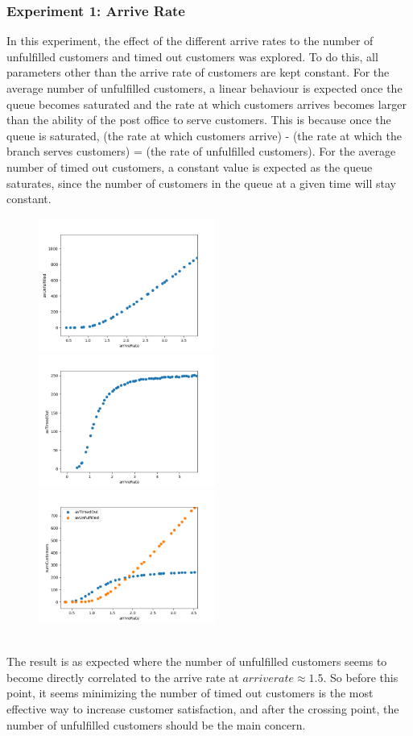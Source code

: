 \documentclass{article}
\begin{document}
\subsubsection{Experiment 1: Arrive Rate}
In this experiment, the effect of the different arrive rates to the number of unfulfilled customers and timed out customers was explored. To do this, all parameters other than the arrive rate of customers are kept constant. For the average number of unfulfilled customers, a linear behaviour is expected once the queue becomes saturated and the rate at which customers arrives becomes larger than the ability of the post office to serve customers. This is because once the queue is saturated, (the rate at which customers arrive) - (the rate at which the branch serves customers) = (the rate of unfulfilled customers). For the average number of timed out customers, a constant value is expected as the queue saturates, since the number of customers in the queue at a given time will stay constant.
\begin{figure}[h]
\includegraphics[width=5.8cm]{arriveRate_avUnfulfilled.png}
\includegraphics[width=5.8cm]{arriveRate_avTimedOut.png}
\includegraphics[width=5.8cm]{change_arriveRate.png}
\end{figure}
\\
The result is as expected where the number of unfulfilled customers seems to become directly correlated to the arrive rate at \(arriverate \approx 1.5\). So before this point, it seems minimizing the number of timed out customers is the most effective way to increase customer satisfaction, and after the crossing point, the number of unfulfilled customers should be the main concern.
\end{document}
